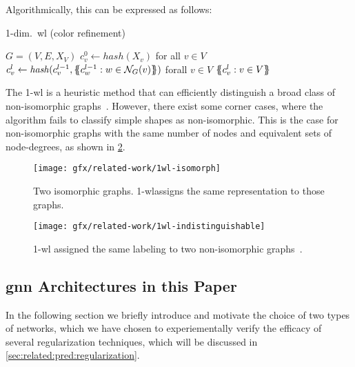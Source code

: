 Algorithmically, this can be expressed as follows:
\begin{algorithm}[H]
    \caption{1-dim.\ \ac{wl} (color refinement)}
    \begin{algorithmic}[1]
        \Require $G = (V,E,X_{V})$
        \State $c_{v}^{0} \gets \mathit{hash}(X_{v})$ for all $v \in V$
        \Repeat
        \State $c_{v}^{l} \gets \mathit{hash}(c_{v}^{l-1}, \ldblbrace c_{w}^{l-1}: w \in \mathcal N_{G}(v)\rdblbrace)$ forall $v \in V$
        \State \Return $\ldblbrace c_{v}^l : v \in V \rdblbrace$
    \end{algorithmic}
\end{algorithm}

The 1-\acs{wl} is a heuristic method that can efficiently distinguish a broad class of non-isomorphic
graphs~\cite{Babai1979}.
However, there exist some corner cases, where the algorithm fails to classify
simple shapes as non-isomorphic. This is the case for non-isomorphic graphs with the same number of nodes and equivalent sets of node-degrees, as shown in \cref*{fig:related:1-wl-indistinguishable}.

\begin{figure}[H]
    \centering
    \texttt{[image: gfx/related-work/1wl-isomorph]}
    \caption{Two isomorphic graphs. 1-\ac{wl}assigns the same representation to those graphs.}\label{fig:related:1-wl-indistinguishable}
\end{figure}

\begin{figure}[H]
    \centering
    \texttt{[image: gfx/related-work/1wl-indistinguishable]}
    \caption{1-\ac{wl} assigned the same labeling to two non-isomorphic graphs~\cite{Liu2022}.}\label{fig:related:1-wl-indistinguishable}
\end{figure}


\subsection{\acs*{gnn} Architectures in this Paper}
\label{sec:related:architectures}


In the following section we briefly introduce and
motivate the choice of two types of networks, which we have
chosen to experiementally verify the efficacy of several regularization techniques, which will be discussed in \cref{sec:related:pred:regularization}.

